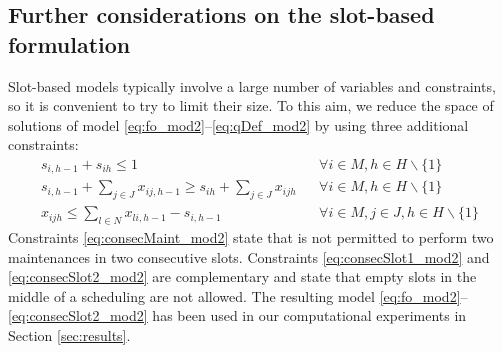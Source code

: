 \documentclass[a4paper,11pt]{article}
\begin{document}
\subsection{Further considerations on the slot-based formulation}
%
Slot-based models typically involve a large number of variables and constraints, so it is convenient to try to limit their size. 
To this aim, we reduce the space of solutions of model \eqref{eq:fo_mod2}--\eqref{eq:qDef_mod2} by using three additional constraints:
\begin{eqnarray}
\label{eq:consecMaint_mod2} s_{i,h-1} + s_{ih} \leq 1 && \forall i \in M, h \in H\backslash\{1\}\\
\label{eq:consecSlot1_mod2} s_{i,h-1} + \sum_{j \in J}{x_{ij,h-1}} \geq s_{ih} + \sum_{j \in J}{x_{ijh}}  && \forall i \in M, h \in H\backslash\{1\}\\
\label{eq:consecSlot2_mod2} x_{ijh}  \leq \sum_{l \in N}{x_{li,h-1}} - s_{i,h-1}  && \forall i \in M, j \in J, h \in H\backslash\{1\}
\end{eqnarray}
Constraints \eqref{eq:consecMaint_mod2} state that is not permitted to perform two maintenances in two consecutive slots. Constraints \eqref{eq:consecSlot1_mod2} and \eqref{eq:consecSlot2_mod2} are complementary and state that empty slots in the middle of a scheduling are not allowed. The resulting model 
\eqref{eq:fo_mod2}--\eqref{eq:consecSlot2_mod2} has been used in our computational experiments in Section \ref{sec:results}. 
\end{document}
